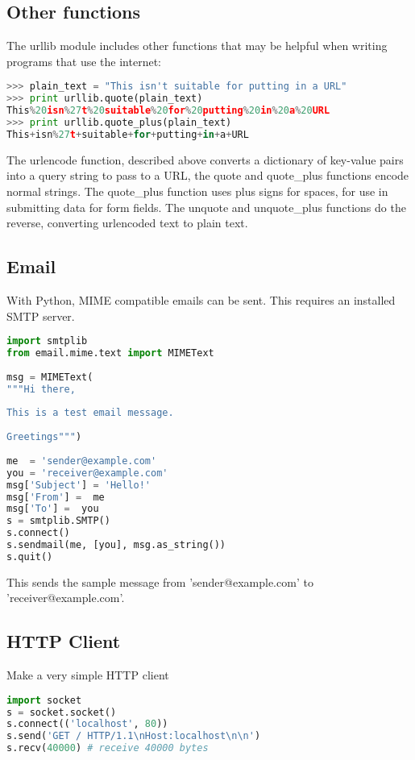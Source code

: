 \subsection{Other functions}
The urllib module includes other functions that may be helpful when writing
programs that use the internet:
\lstset{basicstyle=\scriptsize, numbers=left, captionpos=b, tabsize=4}
\begin{lstlisting}[caption=Urllib Example,language={Python},
xleftmargin=15pt, label=lst:urllibexample]
>>> plain_text = "This isn't suitable for putting in a URL"
>>> print urllib.quote(plain_text)
This%20isn%27t%20suitable%20for%20putting%20in%20a%20URL
>>> print urllib.quote_plus(plain_text)
This+isn%27t+suitable+for+putting+in+a+URL
\end{lstlisting}

The urlencode function, described above converts a dictionary of key-value pairs
into a query string to pass to a URL, the quote and quote\_plus functions encode
normal strings. The quote\_plus function uses plus signs for spaces, for use in
submitting data for form fields. The unquote and unquote\_plus functions do the
reverse, converting urlencoded text to plain text.

\subsection{Email}
With Python, MIME compatible emails can be sent. This requires an installed SMTP
server.
\lstset{basicstyle=\scriptsize, numbers=left, captionpos=b, tabsize=4}
\begin{lstlisting}[caption=Email Example,language={Python},
xleftmargin=15pt, label=lst:emailexample]
import smtplib
from email.mime.text import MIMEText
 
msg = MIMEText( 
"""Hi there,
 
This is a test email message.
 
Greetings""")
 
me  = 'sender@example.com'
you = 'receiver@example.com'
msg['Subject'] = 'Hello!'
msg['From'] =  me
msg['To'] =  you
s = smtplib.SMTP()
s.connect()
s.sendmail(me, [you], msg.as_string())
s.quit()
\end{lstlisting}

This sends the sample message from 'sender@example.com' to
'receiver@example.com'.

\subsection{HTTP Client}
Make a very simple HTTP client
\lstset{basicstyle=\scriptsize, numbers=left, captionpos=b, tabsize=4}
\begin{lstlisting}[caption=HTTP Client,language={Python},
xleftmargin=15pt, label=lst:httpclient]
import socket
s = socket.socket()
s.connect(('localhost', 80))
s.send('GET / HTTP/1.1\nHost:localhost\n\n')
s.recv(40000) # receive 40000 bytes
\end{lstlisting}
